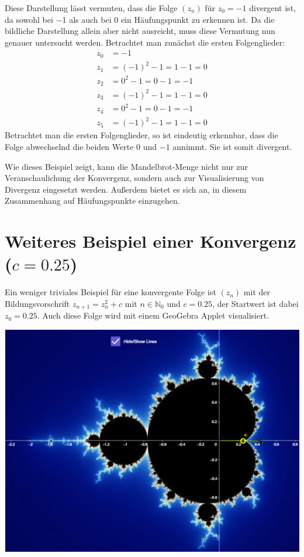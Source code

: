 \documentclass[a4paper, 12pt]{book}
\begin{document}
Diese Darstellung lässt vermuten, dass die Folge
\(\left( z_{n} \right)\) für \(z_{0} =  - 1\) divergent ist, da
sowohl bei \(-\)1 als auch bei 0 ein Häufungspunkt zu erkennen ist. Da
die bildliche Darstellung allein aber nicht ausreicht, muss diese
Vermutung nun genauer untersucht werden. Betrachtet man zunächst die
ersten Folgenglieder:
\begin{align*}
z_{0} &=  - 1 \\
z_{1} &= ( - 1)^{2} - 1 = 1 - 1 = 0 \\
z_{2} &= 0^{2} - 1 = 0 - 1 =  - 1 \\
z_{3} &= ( - 1)^{2} - 1 = 1 - 1 = 0 \\
z_{4} &= 0^{2} - 1 = 0 - 1 =  - 1 \\
z_{5} &= ( - 1)^{2} - 1 = 1 - 1 = 0
\end{align*}
Betrachtet man die ersten Folgenglieder, so ist eindeutig erkennbar,
dass die Folge abwechselnd die beiden Werte 0 und \(-1\) annimmt. Sie
ist somit divergent.

Wie dieses Beispiel zeigt, kann die Mandelbrot-Menge nicht nur zur
Veranschaulichung der Konvergenz, sondern auch zur Visualisierung von
Divergenz eingesetzt werden. Außerdem bietet es sich an, in diesem
Zusammenhang auf Häufungspunkte einzugehen.

\section{Weiteres Beispiel einer Konvergenz ($c=0.25$)}

Ein weniger triviales Beispiel für eine konvergente Folge ist
\(\left( z_{n} \right)\) mit der Bildungsvorschrift
\(z_{n + 1} = z_{n}^{2} + c\) mit \(n \in \mathbb{N}_{0}\) und
\(c = 0.25\), der Startwert ist dabei \(z_{0} = 0.25\). Auch
diese Folge wird mit einem GeoGebra Applet visualisiert.

\begin{center}
\includegraphics[width=0.5\linewidth]{image11.png}
\end{center}
\end{document}
